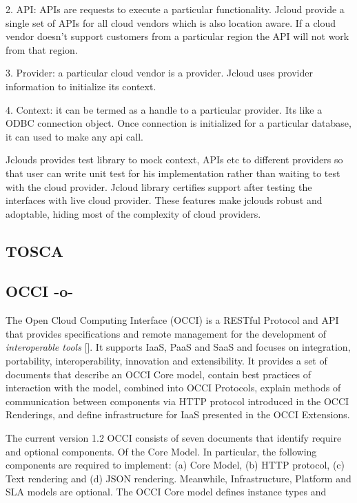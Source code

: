      2. API: APIs are requests to execute a particular
        functionality. Jcloud provide a single set of APIs for all
        cloud vendors which is also location aware. If a cloud vendor
        doesn't support customers from a particular region the API
        will not work from that region.

     3. Provider: a particular cloud vendor is a provider. Jcloud uses
        provider information to initialize its context.

     4. Context: it can be termed as a handle to a particular
        provider. Its like a ODBC connection object. Once connection
        is initialized for a particular database, it can used to make
        any api call.

        Jclouds provides test library to mock context, APIs etc to
        different providers so that user can write unit test for his
        implementation rather than waiting to test with the cloud
        provider. Jcloud library certifies support after testing the
        interfaces with live cloud provider. These features make
        jclouds robust and adoptable, hiding most of the complexity of
        cloud providers.



\subsection{TOSCA}


\subsection{OCCI -o-}

The Open Cloud Computing Interface (OCCI) is a RESTful Protocol and
API that provides specifications and remote management for the
development of \textit{interoperable tools} [\cite{www-occi}]. It
supports IaaS, PaaS and SaaS and focuses on integration, portability,
interoperability, innovation and extensibility. It provides a set of
documents that describe an OCCI Core model, contain best practices of
interaction with the model, combined into OCCI Protocols, explain
methods of communication between components via HTTP protocol
introduced in the OCCI Renderings, and define infrastructure for IaaS
presented in the OCCI Extensions.

The current version 1.2 OCCI consists of seven documents that identify
require and optional components. Of the Core Model.  In particular,
the following components are required to implement: (a) Core Model,
(b) HTTP protocol, (c) Text rendering and (d) JSON
rendering. Meanwhile, Infrastructure, Platform and SLA models are
optional.  The OCCI Core model defines instance types and

